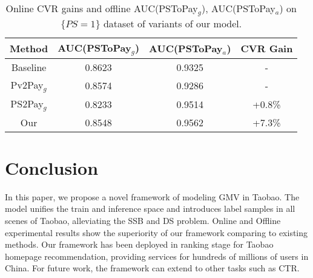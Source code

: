 \documentclass[sigconf]{acmart}
\begin{document}
\begin{table}
\centering
\caption{Online CVR gains and offline AUC(PSToPay$_g$), AUC(PSToPay$_a$) on $\{PS=1\}$ dataset of variants of our model.}
\label{tab:auc2}
\vskip -8pt
\begin{tabular}{c|c|c|c}
\hline
Method & AUC(PSToPay$_g$) & AUC(PSToPay$_a$) & CVR Gain\\
\hline
Baseline & 0.8623 & 0.9325 & - \\
Pv2Pay$_g$ & 0.8574 & 0.9286 & - \\
PS2Pay$_g$ & 0.8233 & 0.9514 & +0.8\% \\
Our & 0.8548 & 0.9562 & +7.3\%\\
\hline
\end{tabular}
\vskip -5pt
\end{table}


\section{Conclusion}
In this paper, we propose a novel framework of modeling GMV in Taobao. The model unifies the train and inference space and introduces label samples in all scenes of Taobao, alleviating the SSB and DS problem.
Online and Offline experimental results show the superiority of our framework comparing to existing methods. Our framework has been deployed in ranking stage for Taobao homepage recommendation, providing services for hundreds of millions of users in China.
For future work, the framework can extend to other tasks such as CTR.







\end{document}
